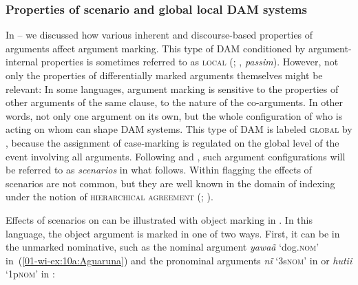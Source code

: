 \documentclass[output=paper]{LSP/langsci}
\begin{document}
\subsubsection{Properties of scenario and global \vs local DAM systems}
\label{01-wi-sec:2.1.5-Scenario-global-local}

In – we discussed how various inherent and discourse-based properties of arguments affect argument marking. 
This type of DAM conditioned by argument-internal properties is sometimes referred to as \textsc{local} (\citealt[178]{Silverstein1976Hierarchy}; \citealt[213]{Malchukov2008Animacy}, \textit{passim}). 
However, not only the properties of differentially marked arguments themselves might be relevant: In some languages, argument marking is sensitive to the properties of other arguments of the same clause, \ie to the nature of the co-arguments. 
In other words, not only one argument on its own, but the whole configuration of who is acting on whom can shape DAM systems. 
This type of DAM is labeled \textsc{global} by \citet[178]{Silverstein1976Hierarchy}, because the assignment of case-marking is regulated on the global level of the event involving all arguments. 
Following \citet{Bickel1995Vestibule, Bickel2011Grammatical} and \citet{Zuniga2006Deixis}, such argument configurations will be referred to as \textit{scenarios} in what follows. 
Within flagging the effects of scenarios are not common, but they are well known in the domain of indexing under the notion of \textsc{hierarchical agreement} (\cf \citealt{Siewierska2003Person}; \citeyear[51--56]{Siewierska2004Person}). 

Effects of scenarios on  can be illustrated with object marking in . 
In this language, the object argument is marked in one of two ways. 
First, it can be in the unmarked nominative, such as the nominal argument \textit{yawaã} ‘dog.\textsc{nom}’ in~(\ref{01-wi-ex:10a:Aguaruna}) and the pronominal arguments \textit{nĩ} ‘3s\textsc{nom}’ in  or \textit{hutii} ‘1p\textsc{nom}’ in :
\end{document}
